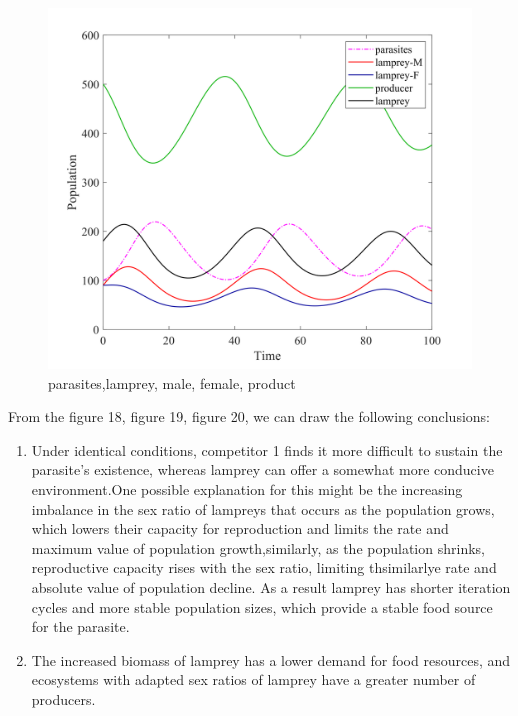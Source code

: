 \documentclass[12pt]{article}  %
\begin{document}
\begin{figure}[htbp]  %
	\centering  %
	\includegraphics[width=.9\textwidth]{img/nocomp.png} %
	\caption{parasites,lamprey, male, female, product} %
\end{figure}

\par

From the figure 18, figure 19, figure 20, we can draw the following conclusions:\par


\begin{enumerate}[\bfseries (1).]
	\item Under identical conditions, competitor 1 finds it more difficult to sustain the parasite's existence, whereas lamprey can offer a somewhat more conducive environment.One possible explanation for this might be the increasing imbalance in the sex ratio of lampreys that occurs as the population grows, which lowers their capacity for reproduction and limits the rate and maximum value of population growth,similarly, as the population shrinks, reproductive capacity rises with the sex ratio, limiting thsimilarlye rate and absolute value of population decline. As a result lamprey has shorter iteration cycles and more stable population sizes, which provide a stable food source for the parasite.\par
	
	\item The increased biomass of lamprey has a lower demand for food resources, and ecosystems with adapted sex ratios of lamprey have a greater number of producers.
\end{enumerate}
\par
\end{document}
